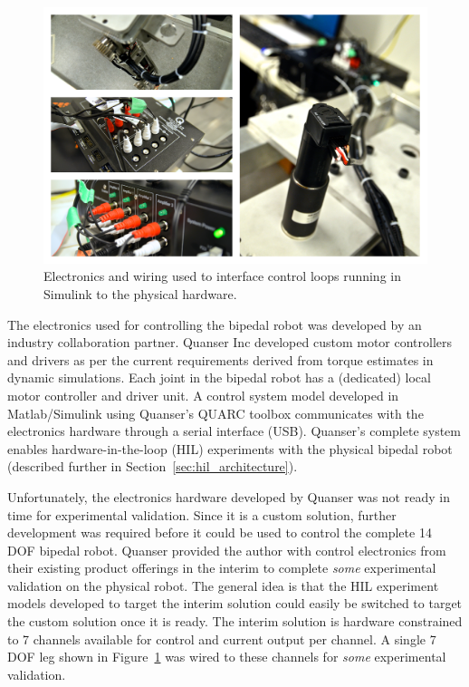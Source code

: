 \begin{figure}[!b]
	\centering
    \includegraphics[scale=0.39]{fig/hardware/bipedwired.png} 
  	\caption{Electronics and wiring used to interface control loops running in Simulink to the physical hardware.}
	\label{fig:bipedwired}
\end{figure}

The electronics used for controlling the bipedal robot was developed by an industry collaboration partner. Quanser Inc developed custom motor controllers and drivers as per the current requirements derived from torque estimates in dynamic simulations. Each joint in the bipedal robot has a (dedicated) local motor controller and driver unit. A control system model developed in Matlab/Simulink using Quanser's QUARC toolbox communicates with the electronics hardware through a serial interface (USB). Quanser's complete system enables hardware-in-the-loop (HIL) experiments with the physical bipedal robot (described further in Section~\ref{sec:hil_architecture}).    

Unfortunately, the electronics hardware developed by Quanser was not ready in time for experimental validation. Since it is a custom solution, further development was required before it could be used to control the complete 14 DOF bipedal robot. Quanser provided the author with control electronics from their existing product offerings in the interim to complete \emph{some} experimental validation on the physical robot. The general idea is that the HIL experiment models developed to target the interim solution could easily be switched to target the custom solution once it is ready. The interim solution is hardware constrained to 7 channels available for control and current output per channel. A single 7 DOF leg shown in Figure~\ref{fig:bipedwired} was wired to these channels for \emph{some} experimental validation. 

